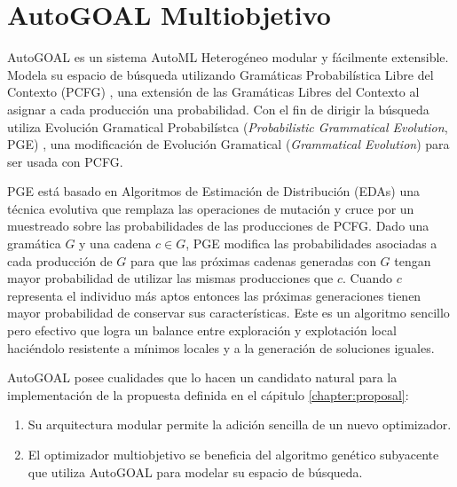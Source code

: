 \chapter{AutoGOAL Multiobjetivo}\label{chapter:implementation}
AutoGOAL  es un sistema AutoML Heterog\'eneo modular y f\'acilmente extensible. Modela su espacio de b\'usqueda utilizando Gram\'aticas Probabil\'istica  Libre del Contexto (PCFG) , una extensi\'on de las Gram\'aticas Libres del Contexto al asignar a cada producci\'on una probabilidad. Con el fin de dirigir la b\'usqueda utiliza Evoluci\'on Gramatical Probabil\'istca (\textit{Probabilistic Grammatical Evolution}, PGE) , una modificaci\'on de Evoluci\'on Gramatical (\textit{Grammatical Evolution}) 
para ser usada con PCFG.

PGE est\'a basado en Algoritmos de Estimaci\'on de Distribuci\'on (EDAs)  una t\'ecnica evolutiva que remplaza las operaciones de mutaci\'on y cruce por un muestreado sobre las probabilidades de las producciones de PCFG. Dado una gram\'atica $G$ y una cadena $c \in G$, PGE modifica las probabilidades asociadas a cada producci\'on de $G$ para que las pr\'oximas cadenas generadas con $G$ tengan mayor probabilidad de utilizar las mismas producciones que $c$. Cuando $c$ representa el individuo m\'as aptos entonces las pr\'oximas generaciones tienen mayor probabilidad de conservar sus caracter\'isticas.
Este es un algoritmo sencillo pero efectivo que logra un balance entre exploraci\'on y explotaci\'on local haci\'endolo resistente a m\'inimos locales y a la generaci\'on de soluciones iguales.

AutoGOAL posee cualidades que lo hacen un candidato natural para la implementaci\'on de la propuesta definida en el c\'apitulo \ref{chapter:proposal}:
\begin{enumerate}
    \item Su arquitectura modular permite la adici\'on sencilla  de un nuevo optimizador. 
    \item El optimizador multiobjetivo se beneficia del algoritmo gen\'etico subyacente que utiliza AutoGOAL para modelar su espacio de b\'usqueda. 
\end{enumerate}

